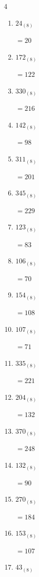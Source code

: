 \begin{multicols}{4}
\begin{enumerate}
  \item $24_{(8)}$

        $=20$

  \item $172_{(8)}$

        $=122$

  \item $330_{(8)}$

        $=216$

  \item $142_{(8)}$

        $=98$

  \item $311_{(8)}$

        $=201$

  \item $345_{(8)}$

        $=229$

  \item $123_{(8)}$

        $=83$

\columnbreak %

  \item $106_{(8)}$

        $=70$

  \item $154_{(8)}$

        $=108$

  \item $107_{(8)}$

        $=71$

  \item $335_{(8)}$

        $=221$

  \item $204_{(8)}$

        $=132$

  \item $370_{(8)}$

        $=248$

  \item $132_{(8)}$

        $=90$

  \item $270_{(8)}$

        $=184$

  \item $153_{(8)}$

        $=107$

  \item $43_{(8)}$


\end{enumerate}
\end{multicols}
